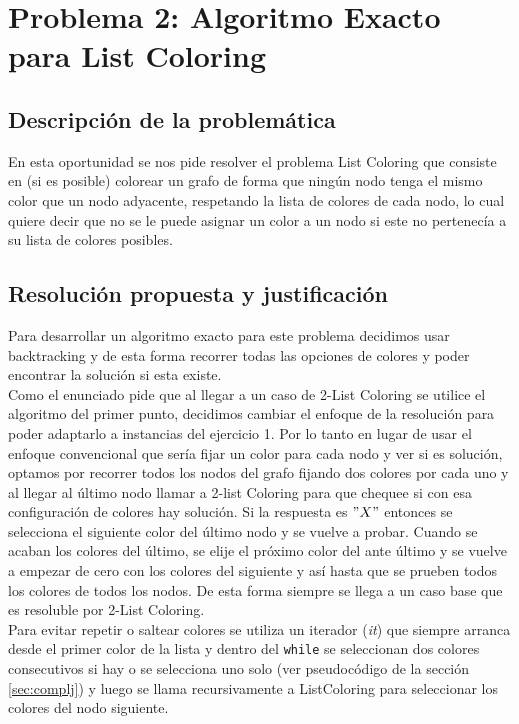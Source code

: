 \newpage
\section{Problema 2: Algoritmo Exacto para List Coloring}

\subsection{Descripción de la problemática}
En esta oportunidad se nos pide resolver el problema List Coloring que consiste en (si es posible) colorear un grafo de forma que ningún nodo tenga el mismo color que un nodo adyacente, respetando la lista de colores de cada nodo, lo cual quiere decir que no se le puede asignar un color a un nodo si este no pertenecía a su lista de colores posibles. 

\subsection{Resolución propuesta y justificación}

Para desarrollar un algoritmo exacto para este problema decidimos usar backtracking y de esta forma recorrer todas las opciones de colores y poder encontrar la solución si esta existe.\\

Como el enunciado pide que al llegar a un caso de 2-List Coloring se utilice el algoritmo del primer punto, decidimos cambiar el enfoque de la resolución para poder adaptarlo a instancias del ejercicio 1. Por lo tanto en lugar de usar el enfoque convencional que sería fijar un color para cada nodo y ver si es solución, optamos por recorrer todos los nodos del grafo fijando dos colores por cada uno y al llegar al último nodo llamar a 2-list Coloring para que chequee si con esa configuración de colores hay solución. Si la respuesta es $"X"$ entonces se selecciona el siguiente color del último nodo y se vuelve a probar. Cuando se acaban los colores del último, se elije el próximo color del ante último y se vuelve a empezar de cero con los colores del siguiente y así hasta que se prueben todos los colores de todos los nodos. De esta forma siempre se llega a un caso base que es resoluble por 2-List Coloring.\\

Para evitar repetir o saltear colores se utiliza un iterador (\emph{it}) que siempre arranca desde el primer color de la lista y dentro del \texttt{while} se seleccionan dos colores consecutivos si hay o se selecciona uno solo (ver pseudocódigo de la sección \ref{sec:complj}) y luego se llama recursivamente a ListColoring para seleccionar los colores del nodo siguiente.\\

